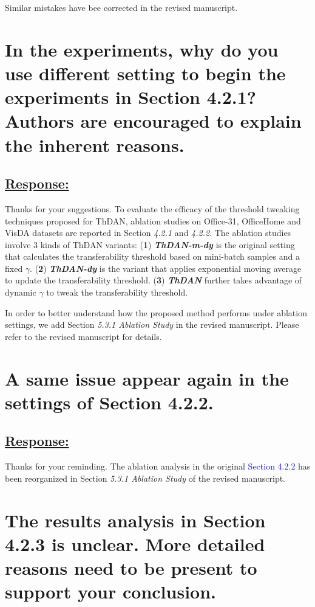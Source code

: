 Similar mistakes have bee corrected in the revised manuscript.


\section{In the experiments, why do you use different setting to begin the experiments in Section 4.2.1? Authors are encouraged to explain the inherent reasons.}
\subsection*{\underline{\textbf{Response:}}}

Thanks for your suggestions.
To evaluate the efficacy of the threshold tweaking techniques proposed for ThDAN, ablation studies on Office-31, OfficeHome and VisDA datasets are reported in Section \textit{4.2.1} and \textit{4.2.2}.
The ablation studies involve 3 kinds of ThDAN variants:
(\textbf{1}) \textit{\textbf{ThDAN-m-dy}} is the original setting that calculates the transferability threshold based on mini-batch samples and a fixed $\gamma$.
(\textbf{2}) \textit{\textbf{ThDAN-dy}} is the variant that applies exponential moving average to update the transferability threshold.
(\textbf{3}) \textit{\textbf{ThDAN}} further takes advantage of dynamic $\gamma$ to tweak the transferability threshold.

In order to better understand how the proposed method performs under ablation settings, we add Section \textit{5.3.1 Ablation Study} in the revised manuscript.
Please refer to the revised manuscript for details.


\section{A same issue appear again in the settings of Section 4.2.2.}
\subsection*{\underline{\textbf{Response:}}}

Thanks for your reminding.
The ablation analysis in the original \textcolor{blue}{Section 4.2.2} has been reorganized in Section \textit{5.3.1 Ablation Study} of the revised manuscript.


\section{The results analysis in Section 4.2.3 is unclear. More detailed reasons need to be present to support your conclusion.}
